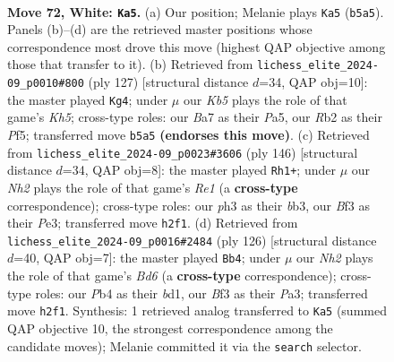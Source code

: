 \documentclass[11pt]{article}
\begin{document}
\clearpage

\begin{figure}[p]\centering
\begin{subfigure}{0.46\textwidth}\centering
\resizebox{\linewidth}{!}{%
\newchessgame
\chessboard[
  setfen={2b5/B4k2/8/1K6/PP6/5Brp/1R5N/8 w - - 1 72},
  showmover=false,
  pgfstyle=straightmove, color=movearrow, markmove={b5-a5}
]}
\caption{}
\end{subfigure}\hfill
\begin{subfigure}{0.46\textwidth}\centering
\resizebox{\linewidth}{!}{%
\newchessgame
\chessboard[
  setfen={8/8/8/p4p1p/Pb5k/1r6/1PR5/6K1 b - - 9 64},
  showmover=false,
  pgfstyle=straightmove, color=movearrow, markmove={h4-g4}
]}
\caption{}
\end{subfigure}
\\[4pt]
\begin{subfigure}{0.46\textwidth}\centering
\resizebox{\linewidth}{!}{%
\newchessgame
\chessboard[
  setfen={1B6/6pk/5p2/8/6P1/1b1rPPK1/8/4R3 w - - 34 74},
  showmover=false,
  pgfstyle=straightmove, color=movearrow, markmove={e1-h1}
]}
\caption{}
\end{subfigure}\hfill
\begin{subfigure}{0.46\textwidth}\centering
\resizebox{\linewidth}{!}{%
\newchessgame
\chessboard[
  setfen={8/5k2/R2B1p2/3p4/p2P4/P3K3/r7/3b4 w - - 22 64},
  showmover=false,
  pgfstyle=straightmove, color=movearrow, markmove={d6-b4}
]}
\caption{}
\end{subfigure}
\caption{\textbf{Move 72, White: \texttt{Ka5}.} (a) Our position; Melanie plays \texttt{Ka5} (\texttt{b5a5}). Panels (b)--(d) are the retrieved master positions whose correspondence most drove this move (highest QAP objective among those that transfer to it). (b) Retrieved from \texttt{lichess\_elite\_2024-09\_p0010\#800} (ply 127) [structural distance $d$=34, QAP obj=10]: the master played \texttt{Kg4}; under $\mu$ our \emph{Kb5} plays the role of that game's \emph{Kh5}; cross-type roles: our \emph{B}a7 as their \emph{P}a5, our \emph{R}b2 as their \emph{P}f5; transferred move \texttt{b5a5} \textbf{(endorses this move)}. (c) Retrieved from \texttt{lichess\_elite\_2024-09\_p0023\#3606} (ply 146) [structural distance $d$=34, QAP obj=8]: the master played \texttt{Rh1+}; under $\mu$ our \emph{Nh2} plays the role of that game's \emph{Re1} (a \textbf{cross-type} correspondence); cross-type roles: our \emph{p}h3 as their \emph{b}b3, our \emph{B}f3 as their \emph{P}e3; transferred move \texttt{h2f1}. (d) Retrieved from \texttt{lichess\_elite\_2024-09\_p0016\#2484} (ply 126) [structural distance $d$=40, QAP obj=7]: the master played \texttt{Bb4}; under $\mu$ our \emph{Nh2} plays the role of that game's \emph{Bd6} (a \textbf{cross-type} correspondence); cross-type roles: our \emph{P}b4 as their \emph{b}d1, our \emph{B}f3 as their \emph{P}a3; transferred move \texttt{h2f1}. Synthesis: 1 retrieved analog transferred to \texttt{Ka5} (summed QAP objective 10, the strongest correspondence among the candidate moves); Melanie committed it via the \texttt{search} selector.}
\label{fig:thought-m142}
\end{figure}
\end{document}
